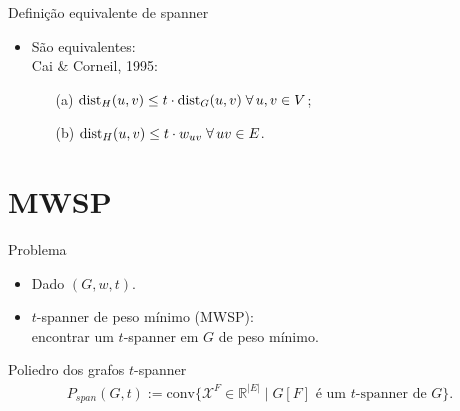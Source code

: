 \documentclass[dvipsnames]{beamer}
\newcommand{\dist}{{\rm dist}}
\newcommand{\incid}{\mathcal{X}}
\newcommand{\espacoX}{\mathbb{R}^{|E|}}
\begin{document}
\begin{frame}{Definição equivalente de spanner \hyperlink{defspan}{}}
  \hypertarget{span}{}
  \begin{itemize}
  \item São equivalentes:\\
    Cai \& Corneil, 1995:\\
      \begin{itemize}
      \item[{\rm (a)}] $\dist_{H}(u,v) \le t \cdot \dist_{G}(u,v) \;\forall\,u,v \in V$;
        \item[{\rm (b)}] $\dist_{H}(u,v) \le t \cdot w_{uv} \;\forall\,uv \in E$.
        \end{itemize}
    \end{itemize}
\end{frame}


\section{MWSP}

\begin{frame}{Problema}
  \begin{itemize}
    \item Dado $(G,w,t)$.
    \item $t$-spanner de peso mínimo (MWSP):\\
      encontrar um $t$-spanner em $G$ de peso mínimo.
  \end{itemize}
\end{frame}


\begin{frame}{Poliedro dos grafos $t$-spanner}
  \begin{equation*}
    \begin{split}
      P_{span}(G,t) := \text{conv}\{\incid^{F} \in \espacoX\; |\; \text{$G[F]$ é um $t$-spanner de $G$\}}. 
    \end{split}
  \end{equation*}
  
  \end{frame}
\end{document}
